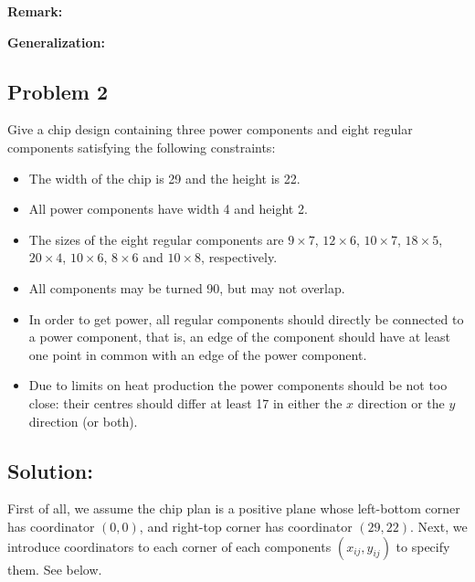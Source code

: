 \documentclass[11pt]{article}
\begin{document}
{\vspace{3mm}

{\bf Remark:}

\vspace{3mm}

{\bf Generalization:}


\vspace{5mm}

\subsection*{Problem 2}

Give a chip design containing three power components and eight regular components satisfying the following constraints:
\begin{itemize}
  \item The width of the chip is 29 and the height is 22.
  \item All power components have width 4 and height 2.
  \item The sizes of the eight regular components are $9 \times 7$, $12 \times 6$, $10 \times 7$, $18 \times 5$, $20 \times 4$, $10 \times 6$, $8 \times 6$ and $10 \times 8$, respectively.
  \item All components may be turned 90, but may not overlap.
  \item In order to get power, all regular components should directly be connected to a power component, that is, an edge of the component should have at least one point in common with an edge of the power component.
  \item Due to limits on heat production the power components should be not too close: their centres should differ at least 17 in either the $x$ direction or the $y$ direction (or both).
\end{itemize}

\vspace{4mm}

\subsection*{Solution:}
First of all, we assume the chip plan is a positive plane whose left-bottom corner has coordinator $(0, 0)$, and right-top corner has coordinator $(29, 22)$.
Next, we introduce coordinators to each corner of each components $(x_{ij}, y_{ij})$ to specify them.
See below.

}
\end{document}
